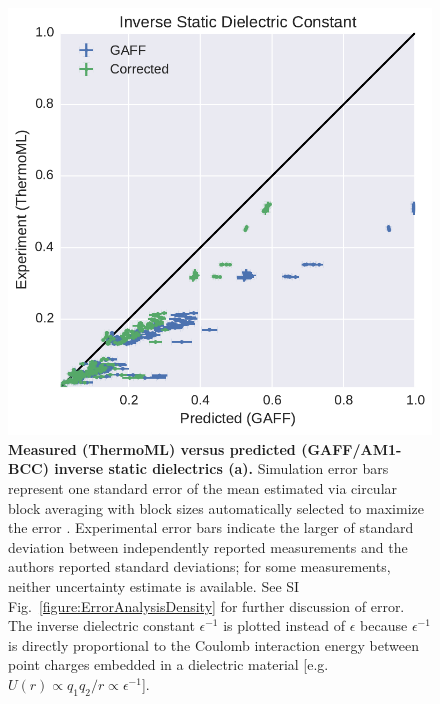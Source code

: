\documentclass[aps,pre,twocolumn,nofootinbib,superscriptaddress,linenumbers]{revtex4-1}
\begin{document}

\begin{figure}
\includegraphics[width=\columnwidth]{./figures/dielectrics_thermoml.pdf}

\caption{{\bf Measured (ThermoML) versus predicted (GAFF/AM1-BCC) inverse static dielectrics (a).}
Simulation error bars represent one standard error of the mean estimated via circular block averaging \cite{sheppard_2015_15681} with block sizes automatically selected to maximize the error \cite{flyvbjerg1989error}.  
Experimental error bars indicate the larger of standard deviation between independently reported measurements and the authors reported standard deviations; for some measurements, neither uncertainty estimate is available.  
See SI Fig.~\ref{figure:ErrorAnalysisDensity} for further discussion of error.  
The inverse dielectric constant $\epsilon^{-1}$ is plotted instead of $\epsilon$ because $\epsilon^{-1}$ is directly proportional to the Coulomb interaction energy between point charges embedded in a dielectric material [e.g. $U(r) \propto q_1 q_2 / r \propto \epsilon^{-1}$].
}
\label{figure:Dielectric}
\end{figure}
\end{document}
